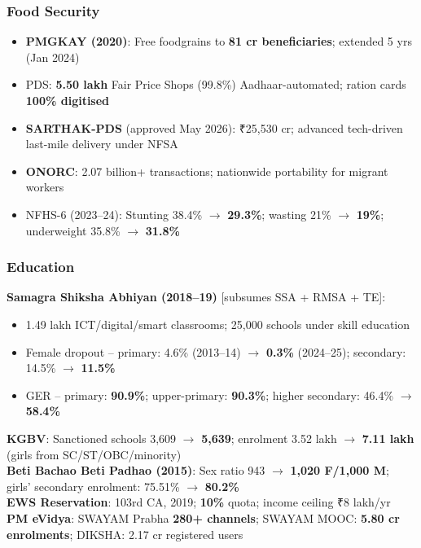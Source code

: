\subsubsection*{Food Security}
\begin{itemize}
  \item \textbf{PMGKAY (2020)}: Free foodgrains to \textbf{81 cr beneficiaries}; extended 5 yrs (Jan 2024)
  \item PDS: \textbf{5.50 lakh} Fair Price Shops (99.8\%) Aadhaar-automated; ration cards \textbf{100\% digitised}
  \item \textbf{SARTHAK-PDS} (approved May 2026): ₹25,530 cr; advanced tech-driven last-mile delivery under NFSA
  \item \textbf{ONORC}: 2.07 billion+ transactions; nationwide portability for migrant workers
  \item NFHS-6 (2023--24): Stunting 38.4\% $\rightarrow$ \textbf{29.3\%}; wasting 21\% $\rightarrow$ \textbf{19\%}; underweight 35.8\% $\rightarrow$ \textbf{31.8\%}
\end{itemize}

\subsubsection*{Education}
\textbf{Samagra Shiksha Abhiyan (2018--19)} [subsumes SSA + RMSA + TE]:
\begin{itemize}
  \item 1.49 lakh ICT/digital/smart classrooms; 25,000 schools under skill education
  \item Female dropout -- primary: 4.6\% (2013--14) $\rightarrow$ \textbf{0.3\%} (2024--25); secondary: 14.5\% $\rightarrow$ \textbf{11.5\%}
  \item GER -- primary: \textbf{90.9\%}; upper-primary: \textbf{90.3\%}; higher secondary: 46.4\% $\rightarrow$ \textbf{58.4\%}
\end{itemize}

\textbf{KGBV}: Sanctioned schools 3,609 $\rightarrow$ \textbf{5,639}; enrolment 3.52 lakh $\rightarrow$ \textbf{7.11 lakh} (girls from SC/ST/OBC/minority)\\
\textbf{Beti Bachao Beti Padhao (2015)}: Sex ratio 943 $\rightarrow$ \textbf{1,020 F/1,000 M}; girls' secondary enrolment: 75.51\% $\rightarrow$ \textbf{80.2\%}\\
\textbf{EWS Reservation}: 103rd CA, 2019; \textbf{10\%} quota; income ceiling ₹8 lakh/yr\\
\textbf{PM eVidya}: SWAYAM Prabha \textbf{280+ channels}; SWAYAM MOOC: \textbf{5.80 cr enrolments}; DIKSHA: 2.17 cr registered users

